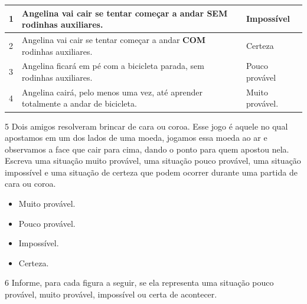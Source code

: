 \begin{longtable}[]{@{}llll@{}}
\toprule
1 & Angelina vai cair se tentar começar a andar \textbf{SEM} rodinhas
auxiliares. & & Impossível\tabularnewline
\midrule
\endhead
2 & Angelina vai cair se tentar começar a andar \textbf{COM} rodinhas
auxiliares. & & Certeza\tabularnewline
3 & Angelina ficará em pé com a bicicleta parada, sem rodinhas
auxiliares. & & Pouco provável\tabularnewline
4 & Angelina cairá, pelo menos uma vez, até aprender totalmente a andar
de bicicleta. & & Muito provável.\tabularnewline
\bottomrule
\end{longtable}


\num{5} Dois amigos resolveram brincar de cara ou coroa. Esse jogo é aquele no
qual apostamos em um dos lados de uma moeda, jogamos essa moeda ao ar e observamos a face
que cair para cima, dando o ponto para quem apostou nela. Escreva uma
situação muito provável, uma situação pouco provável, uma situação
impossível e uma situação de certeza que podem ocorrer durante uma partida de cara ou coroa.

\begin{itemize}
\item Muito provável.


\item Pouco provável.


\item Impossível.


\item Certeza.

\end{itemize}

\num{6} Informe, para cada figura a seguir, se ela representa uma situação pouco
provável, muito provável, impossível ou certa de acontecer.

